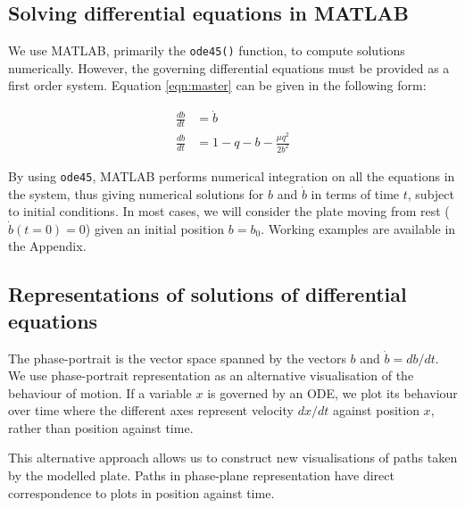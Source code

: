 \documentclass{article}
\begin{document}
\subsection{Solving differential equations in MATLAB}

We use MATLAB, primarily the \texttt{ode45()} function, to compute solutions numerically.
However, the governing differential equations must be provided as a first order system.
Equation \ref{eqn:master} can be given in the following form:

\begin{align}
    \frac{db}{dt}       & = \dot{b}                          \\
    \frac{d\dot{b}}{dt} & = 1 - q - b - \frac{\mu q^2}{2b^2}
    \label{eqn:first_order_system}
\end{align}

By using \texttt{ode45}, MATLAB performs numerical integration on all the equations in the system,
thus giving numerical solutions for $b$ and $\dot{b}$ in terms of time $t$, subject to initial conditions.
In most cases, we will consider the plate moving from rest ($\dot{b}(t=0) = 0$) given an initial position $b=b_0$.
Working examples are available in the Appendix.

\subsection{Representations of solutions of differential equations}

The phase-portrait is the vector space spanned by the vectors $b$ and $\dot{b}=db/dt$.
We use phase-portrait representation as an alternative visualisation of the behaviour of motion. If a variable $x$ is governed by an ODE,
we plot its behaviour over time where the different axes represent velocity $dx/dt$ against position $x$,
rather than position against time.

This alternative approach allows us to construct new visualisations of paths taken by the modelled plate.
Paths in phase-plane representation have direct correspondence to plots in position against time.

\end{document}
